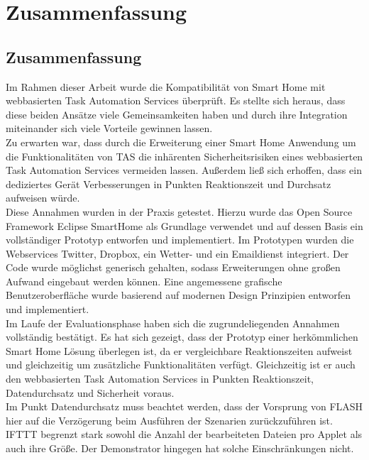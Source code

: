\chapter{Zusammenfassung}
\label{chap:ausblick}

\section{Zusammenfassung}
Im Rahmen dieser Arbeit wurde die Kompatibilität von Smart Home mit webbasierten Task Automation Services überprüft. Es stellte sich heraus, dass diese beiden Ansätze viele Gemeinsamkeiten haben und durch ihre Integration miteinander sich viele Vorteile gewinnen lassen.\\

Zu erwarten war, dass durch die Erweiterung einer Smart Home Anwendung um die Funktionalitäten von TAS die inhärenten Sicherheitsrisiken eines webbasierten Task Automation Services vermeiden lassen. Außerdem ließ sich erhoffen, dass ein dediziertes Gerät Verbesserungen in Punkten Reaktionszeit und Durchsatz aufweisen würde.\\

Diese Annahmen wurden in der Praxis getestet. Hierzu wurde das Open Source Framework Eclipse SmartHome als Grundlage verwendet und auf dessen Basis ein vollständiger Prototyp entworfen und implementiert. Im Prototypen wurden die Webservices Twitter, Dropbox, ein Wetter- und ein Emaildienst integriert. Der Code wurde möglichst generisch gehalten, sodass Erweiterungen ohne großen Aufwand eingebaut werden können. Eine angemessene grafische Benutzeroberfläche wurde basierend auf modernen Design Prinzipien entworfen und implementiert. \\

Im Laufe der Evaluationsphase haben sich die zugrundeliegenden Annahmen vollständig bestätigt. Es hat sich gezeigt, dass der Prototyp einer herkömmlichen Smart Home Lösung überlegen ist, da er vergleichbare Reaktionszeiten aufweist und gleichzeitig um zusätzliche Funktionalitäten verfügt. Gleichzeitig ist er auch den webbasierten Task Automation Services  in Punkten Reaktionszeit, Datendurchsatz und Sicherheit voraus. \\

Im Punkt Datendurchsatz muss beachtet werden, dass der Vorsprung von FLASH hier auf die  Verzögerung beim Ausführen der Szenarien zurückzuführen ist. IFTTT begrenzt stark sowohl die Anzahl der bearbeiteten Dateien pro Applet als auch ihre Größe. Der Demonstrator hingegen hat solche Einschränkungen nicht.

